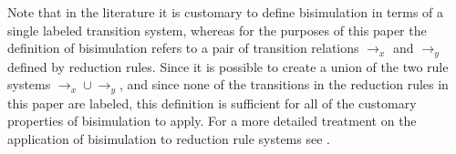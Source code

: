 Note that in the literature it is customary to define bisimulation in
terms of a single labeled transition system, whereas for the purposes
of this paper the definition of bisimulation refers to a pair of
transition relations $\rightarrow_x$ and $\rightarrow_y$ defined by
reduction rules. Since it is possible to create a union of the two
rule systems $\rightarrow_x \cup \rightarrow_y$, and since none of the
transitions in the reduction rules in this paper are labeled, this
definition is sufficient for all of the customary properties of
bisimulation to apply. For a more detailed treatment on the
application of bisimulation to reduction rule systems see
\cite{GSE:barbedbisimulation}.

